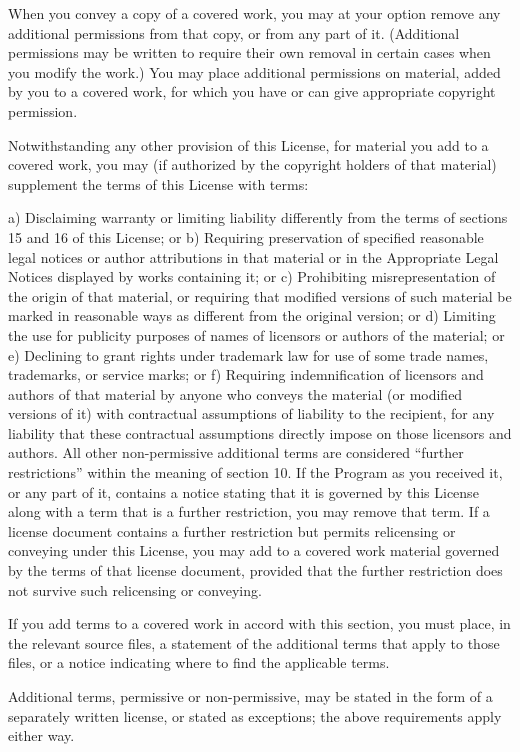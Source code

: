 \documentclass[letterpaper,12pt]{article}
\begin{document}
{When you convey a copy of a covered work, you may at your option remove any additional permissions from that copy, or from any part of it. (Additional permissions may be written to require their own removal in certain cases when you modify the work.) You may place additional permissions on material, added by you to a covered work, for which you have or can give appropriate copyright permission.

Notwithstanding any other provision of this License, for material you add to a covered work, you may (if authorized by the copyright holders of that material) supplement the terms of this License with terms:

a) Disclaiming warranty or limiting liability differently from the terms of sections 15 and 16 of this License; or
b) Requiring preservation of specified reasonable legal notices or author attributions in that material or in the Appropriate Legal Notices displayed by works containing it; or
c) Prohibiting misrepresentation of the origin of that material, or requiring that modified versions of such material be marked in reasonable ways as different from the original version; or
d) Limiting the use for publicity purposes of names of licensors or authors of the material; or
e) Declining to grant rights under trademark law for use of some trade names, trademarks, or service marks; or
f) Requiring indemnification of licensors and authors of that material by anyone who conveys the material (or modified versions of it) with contractual assumptions of liability to the recipient, for any liability that these contractual assumptions directly impose on those licensors and authors.
All other non-permissive additional terms are considered ``further restrictions'' within the meaning of section 10. If the Program as you received it, or any part of it, contains a notice stating that it is governed by this License along with a term that is a further restriction, you may remove that term. If a license document contains a further restriction but permits relicensing or conveying under this License, you may add to a covered work material governed by the terms of that license document, provided that the further restriction does not survive such relicensing or conveying.

If you add terms to a covered work in accord with this section, you must place, in the relevant source files, a statement of the additional terms that apply to those files, or a notice indicating where to find the applicable terms.

Additional terms, permissive or non-permissive, may be stated in the form of a separately written license, or stated as exceptions; the above requirements apply either way.

}
\end{document}
